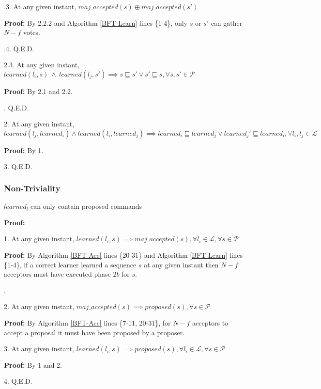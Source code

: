 \indent\indent\indent\indent{}.3. At any given instant, $maj\_accepted(s) \oplus maj\_accepted(s')$ \par
\indent\indent\indent\indent\indent\indent \parbox{\linewidth}{\textbf{Proof:} By 2.2.2 and Algorithm \ref{BFT-Learn} lines \{1-4\}, only $s$ or $s'$ can gather $N-f$ votes.}\par
\indent\indent\indent\indent{}.4. Q.E.D. \par
\indent\indent\indent \parbox{\linewidth}{2.3. At any given instant, $learned(l_i,s)\ \land\ learned(l_j,s') \implies s \sqsubseteq s' \lor s' \sqsubseteq s, \forall s,s' \in \mathcal{P}$ }\par
\indent\indent\indent\indent\textbf{Proof:} By 2.1 and 2.2.\par
\indent\indent{}. Q.E.D. \par
\parbox{\linewidth}{2. At any given instant, $learned(l_j,learned_i) \land learned(l_i,learned_j) \implies learned_i \sqsubseteq learned_j \lor learned_j' \sqsubseteq learned_i, \forall l_i,l_j \in \mathcal{L}$}\par
\indent\indent\textbf{Proof:} By 1.\par
3. Q.E.D. \par

\subsubsection{Non-Triviality}
\begin{theorem}
$learned_l$ can only contain proposed commands \label{N-T1} \par
\end{theorem} 
\textbf{Proof:} \par
1. At any given instant, $learned(l_i,s) \implies maj\_accepted(s),\forall l_i \in \mathcal{L}, \forall s \in \mathcal{P}$ \par
\indent\indent\parbox{\linewidth}{\textbf{Proof:} By Algorithm \ref{BFT-Acc} lines \{20-31\} and Algorithm \ref{BFT-Learn} lines \{1-4\}, if a correct learner learned a sequence $s$ at any given instant then $N-f$ acceptors must have executed phase $2b$ for $s$.}. \par
2. At any given instant, $maj\_accepted(s) \implies proposed(s), \forall s \in \mathcal{P}$ \par
\indent\indent\textbf{Proof:} By Algorithm \ref{BFT-Acc} lines \{7-11, 20-31\}, for $N-f$ acceptors to accept a proposal it must have been proposed by a proposer.\par
3. At any given instant, $learned(l_i,s) \implies proposed(s),\forall l_i \in \mathcal{L}, \forall s \in \mathcal{P}$ \par
\indent\indent\textbf{Proof:} By 1 and 2. \par
4. Q.E.D. \par

